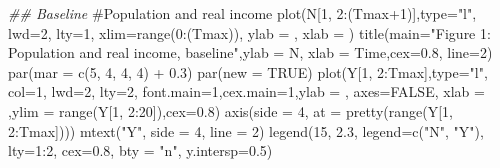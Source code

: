 \documentclass[
  letterpaper,
  DIV=11,
  numbers=noendperiod]{scrreprt}
\newenvironment{Shaded}{\begin{snugshade}}{\end{snugshade}}
\newcommand{\AttributeTok}[1]{\textcolor[rgb]{0.40,0.45,0.13}{#1}}
\newcommand{\CommentTok}[1]{\textcolor[rgb]{0.37,0.37,0.37}{#1}}
\newcommand{\ConstantTok}[1]{\textcolor[rgb]{0.56,0.35,0.01}{#1}}
\newcommand{\DecValTok}[1]{\textcolor[rgb]{0.68,0.00,0.00}{#1}}
\newcommand{\DocumentationTok}[1]{\textcolor[rgb]{0.37,0.37,0.37}{\textit{#1}}}
\newcommand{\FloatTok}[1]{\textcolor[rgb]{0.68,0.00,0.00}{#1}}
\newcommand{\FunctionTok}[1]{\textcolor[rgb]{0.28,0.35,0.67}{#1}}
\newcommand{\NormalTok}[1]{\textcolor[rgb]{0.00,0.23,0.31}{#1}}
\newcommand{\SpecialCharTok}[1]{\textcolor[rgb]{0.37,0.37,0.37}{#1}}
\newcommand{\StringTok}[1]{\textcolor[rgb]{0.13,0.47,0.30}{#1}}
\begin{document}
\begin{Shaded}
\begin{Highlighting}[]
\DocumentationTok{\#\# Baseline}
\CommentTok{\#Population and real income}
\FunctionTok{plot}\NormalTok{(N[}\DecValTok{1}\NormalTok{, }\DecValTok{2}\SpecialCharTok{:}\NormalTok{(Tmax}\SpecialCharTok{+}\DecValTok{1}\NormalTok{)],}\AttributeTok{type=}\StringTok{"l"}\NormalTok{, }\AttributeTok{lwd=}\DecValTok{2}\NormalTok{, }\AttributeTok{lty=}\DecValTok{1}\NormalTok{, }\AttributeTok{xlim=}\FunctionTok{range}\NormalTok{(}\DecValTok{0}\SpecialCharTok{:}\NormalTok{(Tmax)), }\AttributeTok{ylab =} \StringTok{\textquotesingle{}\textquotesingle{}}\NormalTok{, }\AttributeTok{xlab =} \StringTok{\textquotesingle{}\textquotesingle{}}\NormalTok{)}
\FunctionTok{title}\NormalTok{(}\AttributeTok{main=}\StringTok{"Figure 1: Population and real income, baseline"}\NormalTok{,}\AttributeTok{ylab =} \StringTok{\textquotesingle{}N\textquotesingle{}}\NormalTok{, }\AttributeTok{xlab =} \StringTok{\textquotesingle{}Time\textquotesingle{}}\NormalTok{,}\AttributeTok{cex=}\FloatTok{0.8}\NormalTok{, }\AttributeTok{line=}\DecValTok{2}\NormalTok{)}
\FunctionTok{par}\NormalTok{(}\AttributeTok{mar =} \FunctionTok{c}\NormalTok{(}\DecValTok{5}\NormalTok{, }\DecValTok{4}\NormalTok{, }\DecValTok{4}\NormalTok{, }\DecValTok{4}\NormalTok{) }\SpecialCharTok{+} \FloatTok{0.3}\NormalTok{)}
\FunctionTok{par}\NormalTok{(}\AttributeTok{new =} \ConstantTok{TRUE}\NormalTok{)}
\FunctionTok{plot}\NormalTok{(Y[}\DecValTok{1}\NormalTok{, }\DecValTok{2}\SpecialCharTok{:}\NormalTok{Tmax],}\AttributeTok{type=}\StringTok{"l"}\NormalTok{, }\AttributeTok{col=}\DecValTok{1}\NormalTok{, }\AttributeTok{lwd=}\DecValTok{2}\NormalTok{, }\AttributeTok{lty=}\DecValTok{2}\NormalTok{, }\AttributeTok{font.main=}\DecValTok{1}\NormalTok{,}\AttributeTok{cex.main=}\DecValTok{1}\NormalTok{,}\AttributeTok{ylab =} \StringTok{\textquotesingle{}\textquotesingle{}}\NormalTok{, }\AttributeTok{axes=}\ConstantTok{FALSE}\NormalTok{,}
     \AttributeTok{xlab =} \StringTok{\textquotesingle{}\textquotesingle{}}\NormalTok{,}\AttributeTok{ylim =} \FunctionTok{range}\NormalTok{(Y[}\DecValTok{1}\NormalTok{, }\DecValTok{2}\SpecialCharTok{:}\DecValTok{20}\NormalTok{]),}\AttributeTok{cex=}\FloatTok{0.8}\NormalTok{)}
\FunctionTok{axis}\NormalTok{(}\AttributeTok{side =} \DecValTok{4}\NormalTok{, }\AttributeTok{at =} \FunctionTok{pretty}\NormalTok{(}\FunctionTok{range}\NormalTok{(Y[}\DecValTok{1}\NormalTok{, }\DecValTok{2}\SpecialCharTok{:}\NormalTok{Tmax])))  }
\FunctionTok{mtext}\NormalTok{(}\StringTok{"Y"}\NormalTok{, }\AttributeTok{side =} \DecValTok{4}\NormalTok{, }\AttributeTok{line =} \DecValTok{2}\NormalTok{)}
\FunctionTok{legend}\NormalTok{(}\DecValTok{15}\NormalTok{, }\FloatTok{2.3}\NormalTok{, }\AttributeTok{legend=}\FunctionTok{c}\NormalTok{(}\StringTok{"N"}\NormalTok{, }\StringTok{"Y"}\NormalTok{),}
        \AttributeTok{lty=}\DecValTok{1}\SpecialCharTok{:}\DecValTok{2}\NormalTok{, }\AttributeTok{cex=}\FloatTok{0.8}\NormalTok{, }\AttributeTok{bty =} \StringTok{"n"}\NormalTok{, }\AttributeTok{y.intersp=}\FloatTok{0.5}\NormalTok{)}
\end{Highlighting}
\end{Shaded}
\end{document}
